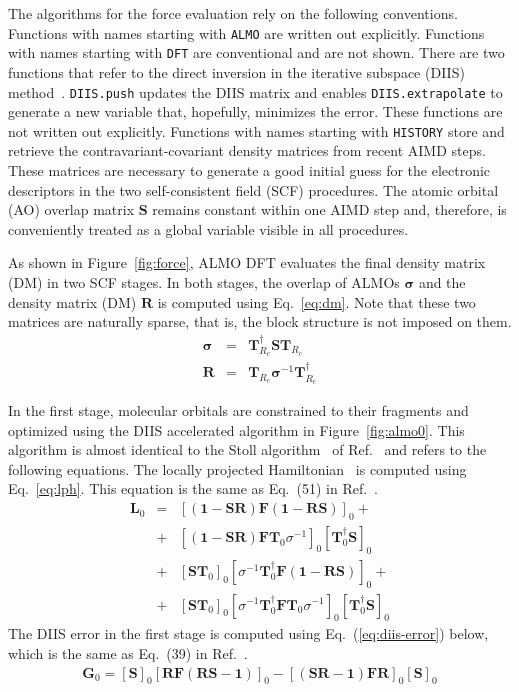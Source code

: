 \documentclass[aip,jcp,reprint,amsmath,amssymb]{revtex4-1}
\begin{document}
The algorithms for the force evaluation rely on the following conventions. Functions with names starting with \texttt{ALMO} are written out explicitly. Functions with names starting with \texttt{DFT} are conventional and are not shown. There are two functions that refer to the direct inversion in the iterative subspace (DIIS) method~\cite{ZZZ}. \texttt{DIIS.push} updates the DIIS matrix and enables \texttt{DIIS.extrapolate} to generate a new variable that, hopefully, minimizes the error. These functions are not written out explicitly. Functions with names starting with \texttt{HISTORY} store and retrieve the contravariant-covariant density matrices from recent AIMD steps. These matrices are necessary to generate a good initial guess for the electronic descriptors in the two self-consistent field (SCF) procedures. The atomic orbital (AO) overlap matrix $\mathbf{S}$ remains constant within one AIMD step and, therefore, is conveniently treated as a global variable visible in all procedures.

As shown in Figure~\ref{fig:force}, ALMO DFT evaluates the final density matrix (DM) in two SCF stages. In both stages, the overlap of ALMOs $\mathbf{\sigma}$ and the density matrix (DM) $\mathbf{R}$ is computed using Eq.~\ref{eq:dm}. Note that these two matrices are naturally sparse, that is, the block structure is not imposed on them.
%
\begin{eqnarray}\label{eq:dm}
\mathbf{\sigma} &=& \mathbf{T}_{R_c}^{\dagger}\mathbf{S} \mathbf{T}_{R_c} \nonumber \\
\mathbf{R} &=& \mathbf{T}_{R_c} \mathbf{\sigma}^{-1} \mathbf{T}_{R_c}^{\dagger}
\end{eqnarray}
%

In the first stage, molecular orbitals are constrained to their fragments and optimized using the DIIS accelerated algorithm in Figure~\ref{fig:almo0}. This algorithm is almost identical to the Stoll algorithm~\cite{a:stoll} of Ref.~\cite{a:khal} and refers to the following equations. The locally projected Hamiltonian~\cite{a:stoll} is computed using Eq.~\ref{eq:lph}. This equation is the same as Eq.~(51) in Ref.~.
%
\begin{eqnarray}\label{eq:lph}
\mathbf{L}_0 &=& [ (\mathbf{1} - \mathbf{SR}) \mathbf{F} (\mathbf{1} - \mathbf{RS}) ]_{0} + \nonumber\\
&+& [ (\mathbf{1} - \mathbf{SR}) \mathbf{FT}_0 \sigma^{-1}]_0 [ \mathbf{T}_0^{\dagger}\mathbf{S} ]_{0} \nonumber\\
&+& [ \mathbf{ST}_0 ]_{0} [ \sigma^{-1}\mathbf{T}_0^{\dagger}\mathbf{F}(\mathbf{1} - \mathbf{RS}) ]_0 + \nonumber\\
&+& [ \mathbf{ST}_0]_0 [ \sigma^{-1}\mathbf{T}_0^{\dagger}\mathbf{FT}_0 \sigma^{-1}]_{0} [ \mathbf{T}_0^{\dagger}\mathbf{S} ]_{0}
\end{eqnarray}
%
The DIIS error in the first stage is computed using Eq.~(\ref{eq:diis-error}) below, which is the same as Eq.~(39) in Ref.~.
%
\begin{eqnarray}\label{eq:diis-error}
\mathbf{G}_0 = [\mathbf{S}]_0 [\mathbf{RF}(\mathbf{RS-1})]_0 - [(\mathbf{SR-1})\mathbf{FR}]_0 [\mathbf{S}]_0
\end{eqnarray}
\end{document}
